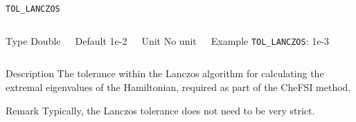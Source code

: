 \begin{frame}[allowframebreaks]{\texttt{TOL\_LANCZOS}} \label{TOL_LANCZOS}
\vspace*{-12pt}
\begin{columns}
\begin{block}{Type}
Double
\end{block}

\begin{block}{Default}
1e-2
\end{block}

\begin{block}{Unit}
No unit
\end{block}

\begin{block}{Example}
\texttt{TOL\_LANCZOS}: 1e-3
\end{block}
\end{columns}

\begin{block}{Description}
The tolerance within the Lanczos algorithm for calculating the extremal eigenvalues of the Hamiltonian, required as part of the CheFSI method. 
\end{block}

\begin{block}{Remark}
Typically, the Lanczos tolerance does not need to be very strict.
\end{block}

\end{frame}




